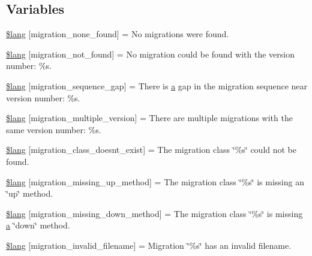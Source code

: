 \subsection*{Variables}
\begin{DoxyCompactItemize}
\item 
\mbox{\hyperlink{migration__lang_8php_afe8d1d5a799cf952a04537e8b532c3d8}{\$lang}} \mbox{[}\textquotesingle{}migration\+\_\+none\+\_\+found\textquotesingle{}\mbox{]} = \textquotesingle{}No migrations were found.\textquotesingle{}
\item 
\mbox{\hyperlink{migration__lang_8php_ae6e7f5ef38bcbaf7b91c1324e463aa76}{\$lang}} \mbox{[}\textquotesingle{}migration\+\_\+not\+\_\+found\textquotesingle{}\mbox{]} = \textquotesingle{}No migration could be found with the version number\+: \%s.\textquotesingle{}
\item 
\mbox{\hyperlink{migration__lang_8php_a0ceeae7dff9f2e5ca94c1b2de395e49a}{\$lang}} \mbox{[}\textquotesingle{}migration\+\_\+sequence\+\_\+gap\textquotesingle{}\mbox{]} = \textquotesingle{}There is \mbox{\hyperlink{interfacea}{a}} gap in the migration sequence near version number\+: \%s.\textquotesingle{}
\item 
\mbox{\hyperlink{migration__lang_8php_ac377d2c284639a9d888aa911bd116a5e}{\$lang}} \mbox{[}\textquotesingle{}migration\+\_\+multiple\+\_\+version\textquotesingle{}\mbox{]} = \textquotesingle{}There are multiple migrations with the same version number\+: \%s.\textquotesingle{}
\item 
\mbox{\hyperlink{migration__lang_8php_a3bc11444283db3c991fe89233611ff71}{\$lang}} \mbox{[}\textquotesingle{}migration\+\_\+class\+\_\+doesnt\+\_\+exist\textquotesingle{}\mbox{]} = \textquotesingle{}The migration class \char`\"{}\%s\char`\"{} could not be found.\textquotesingle{}
\item 
\mbox{\hyperlink{migration__lang_8php_afc56383c5f93b9eb65f6249826d76f99}{\$lang}} \mbox{[}\textquotesingle{}migration\+\_\+missing\+\_\+up\+\_\+method\textquotesingle{}\mbox{]} = \textquotesingle{}The migration class \char`\"{}\%s\char`\"{} is missing an \char`\"{}up\char`\"{} method.\textquotesingle{}
\item 
\mbox{\hyperlink{migration__lang_8php_ab3b0b516243ce7ea4153798e808d0395}{\$lang}} \mbox{[}\textquotesingle{}migration\+\_\+missing\+\_\+down\+\_\+method\textquotesingle{}\mbox{]} = \textquotesingle{}The migration class \char`\"{}\%s\char`\"{} is missing \mbox{\hyperlink{interfacea}{a}} \char`\"{}down\char`\"{} method.\textquotesingle{}
\item 
\mbox{\hyperlink{migration__lang_8php_ac8e3b2b2f1cbd7c9863f108908efb424}{\$lang}} \mbox{[}\textquotesingle{}migration\+\_\+invalid\+\_\+filename\textquotesingle{}\mbox{]} = \textquotesingle{}Migration \char`\"{}\%s\char`\"{} has an invalid filename.\textquotesingle{}
\end{DoxyCompactItemize}


